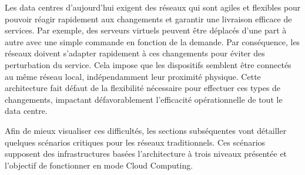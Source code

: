 Les data centres d'aujourd'hui exigent des réseaux qui sont agiles et flexibles pour pouvoir réagir rapidement aux changements et garantir une livraison efficace de services. Par exemple, des serveurs virtuels peuvent être déplacés d'une part à autre avec une simple commande en fonction de la demande. Par conséquence, les réseaux doivent s'adapter rapidement à ces changements pour éviter des perturbation du service. Cela impose que les dispositifs semblent être connectés au même réseau local, indépendamment leur proximité physique. Cette architecture fait défaut de la flexibilité nécessaire pour effectuer ces types de changements, impactant défavorablement l'efficacité opérationnelle de tout le data centre.


Afin de mieux visualiser ces difficultés, les sections subséquentes vont détailler quelques scénarios critiques pour les réseaux traditionnels. Ces scénarios supposent des infrastructures basées l'architecture à trois niveaux présentée et l'objectif de fonctionner en mode Cloud Computing. \cite{hpCloudEffectsOnNetworkChanging} \cite{cloudReadyJuniperReferenceNetworkInfra}  \cite{cloudReadyNetworkJuniper} \cite{bigDataBookChap4}

